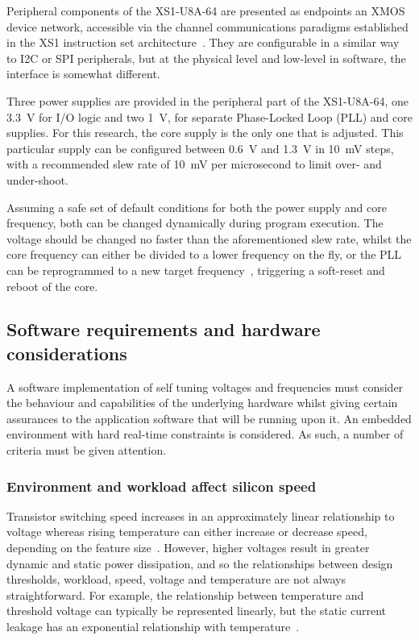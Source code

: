 \documentclass[a4paper,twocolumn,DIV=16]{scrartcl}
\begin{document}
Peripheral components of the XS1-U8A-64 are presented as endpoints an XMOS
device network, accessible via the channel communications paradigms established
in the XS1 instruction set architecture~\cite{XMOS2009a}. They are configurable
in a similar way to I2C or SPI peripherals, but at the physical level and
low-level in software, the interface is somewhat different.

Three power supplies are provided in the peripheral part of the XS1-U8A-64, one
3.3~V for I/O logic and two 1~V, for separate Phase-Locked Loop (PLL) and core
supplies. For this research, the core supply is the only one that is adjusted.
This particular supply can be configured between 0.6~V and 1.3~V in 10~mV steps,
with a recommended slew rate of 10~mV per microsecond to limit over- and
under-shoot.

Assuming a safe set of default conditions for both the power supply and core
frequency, both can be changed dynamically during program execution. The voltage
should be changed no faster than the aforementioned slew rate, whilst the core
frequency can either be divided to a lower frequency on the fly, or the PLL can
be reprogrammed to a new target frequency~\cite{XS1Lsys2008}, triggering a
soft-reset and reboot of the core.

\subsection{Software requirements and hardware considerations}

A software implementation of self tuning voltages and frequencies must consider
the behaviour and capabilities of the underlying hardware whilst giving certain
assurances to the application software that will be running upon it. An embedded
environment with hard real-time constraints is considered. As such, a number of
criteria must be given attention.

\subsubsection*{Environment and workload affect silicon speed}

Transistor switching speed increases in an approximately linear relationship to
voltage whereas rising temperature can either increase or decrease speed,
depending on the feature size~\cite{cmosTempInversion}. However, higher voltages
result in greater dynamic and static power dissipation, and so the relationships
between design thresholds, workload, speed, voltage and temperature are not
always straightforward. For example, the relationship between temperature and
threshold voltage can typically be represented linearly, but the static current
leakage has an exponential relationship with temperature~\cite{Wolpert2012}.
\end{document}
